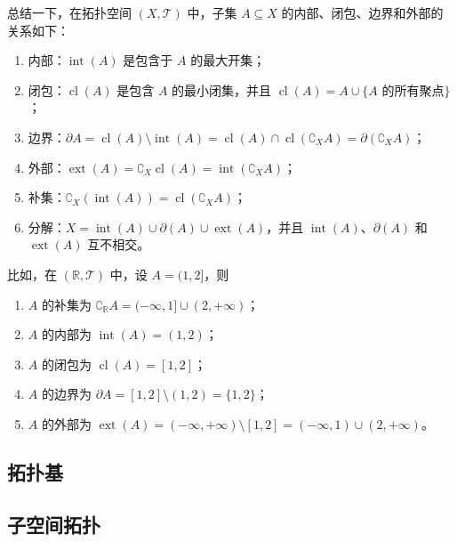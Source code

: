 \begin{note}
    总结一下，在拓扑空间 $(X,\mathcal{T})$ 中，子集 $A\subseteq X$ 的内部、闭包、边界和外部的关系如下：
    \begin{enumerate}
        \item 内部：$\operatorname{int}(A)$ 是包含于 $A$ 的最大开集；
        \item 闭包：$\operatorname{cl}(A)$ 是包含 $A$ 的最小闭集，并且 $\operatorname{cl}(A) = A \cup \{\text{$A$ 的所有聚点}\}$；
        \item 边界：$\partial A = \operatorname{cl}(A) \setminus \operatorname{int}(A) = \operatorname{cl}(A) \cap \operatorname{cl}(\complement_X A)  = \partial (\complement_X A)$；
        \item 外部：$\operatorname{ext}(A) = \complement_X \operatorname{cl}(A) = \operatorname{int}(\complement_X A)$；
        \item 补集：$\complement_X(\operatorname{int}(A)) = \operatorname{cl}(\complement_X A)$；
        \item 分解：$X = \operatorname{int}(A) \cup \partial(A) \cup \operatorname{ext}(A)$，并且 $\operatorname{int}(A)$、$\partial(A)$ 和 $\operatorname{ext}(A)$ 互不相交。
    \end{enumerate}
    比如，在 $(\mathbb{R},\mathcal{T})$ 中，设 $A=(1,2]$，则
    \begin{enumerate}
        \item $A$ 的补集为 $\complement_{\mathbb{R}} A = (-\infty,1] \cup (2,+\infty)$；
        \item $A$ 的内部为 $\operatorname{int}(A)=(1,2)$；
        \item $A$ 的闭包为 $\operatorname{cl}(A)=[1,2]$；
        \item $A$ 的边界为 $\partial A= [1,2]\setminus (1,2) = \{1,2\}$；
        \item $A$ 的外部为 $\operatorname{ext}(A) = (-\infty,+\infty) \setminus [1,2] = (-\infty,1)\cup(2,+\infty)$。
    \end{enumerate}
\end{note}

\vspace{1em}

\subsection{拓扑基}

\vspace{1em}
\subsection{子空间拓扑}

\newpage